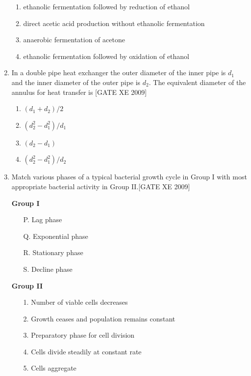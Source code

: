 \documentclass[journal,12pt,onecolumn]{IEEEtran}
\theoremstyle{remark}
\begin{document}
\begin{enumerate}[label=\textbf{Q.\arabic*.}, wide=0pt, leftmargin=*]
\begin{multicols}{2}
\begin{enumerate}
\item ethanolic fermentation followed by reduction of ethanol
\item direct acetic acid production without ethanolic fermentation
\item anaerobic fermentation of acetone
\item ethanolic fermentation followed by oxidation of ethanol
\end{enumerate}
\end{multicols}

\item In a double pipe heat exchanger the outer diameter of the inner pipe is $d_1$ and the inner diameter of the outer pipe is $d_2$. The equivalent diameter of the annulus for heat transfer is
\hfill[GATE XE 2009]
\begin{multicols}{2}
\begin{enumerate}
\item $(d_1 + d_2)/2$
\item $(d_2^2 - d_1^2)/d_1$
\item $(d_2 - d_1)$
\item $(d_2^2 - d_1^2)/d_2$
\end{enumerate}
\end{multicols}

\item Match various phases of a typical bacterial growth cycle in Group I with most appropriate bacterial activity in Group II.\hfill[GATE XE 2009]

\begin{minipage}[t]{0.45\textwidth}
\textbf{Group I}
\begin{itemize}
  \item[P.] Lag phase
  \item[Q.] Exponential phase
  \item[R.] Stationary phase
  \item[S.] Decline phase
\end{itemize}
\end{minipage}
\hfill
\begin{minipage}[t]{0.45\textwidth}
\textbf{Group II}
\begin{itemize}
  \item[1.] Number of viable cells decreases
  \item[2.] Growth ceases and population remains constant
  \item[3.] Preparatory phase for cell division
  \item[4.] Cells divide steadily at constant rate
  \item[5.] Cells aggregate
\end{itemize}
\end{minipage}


\end{enumerate}
\end{document}
